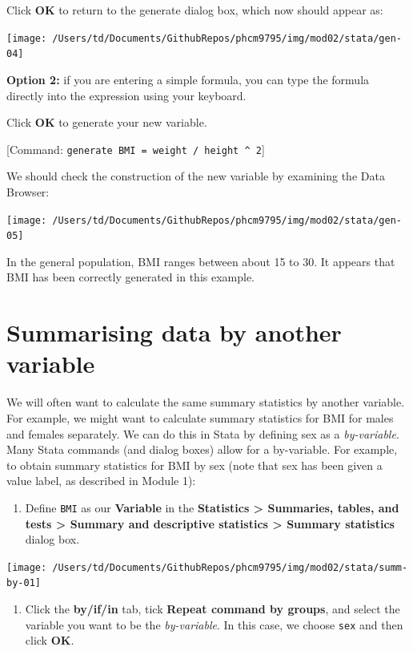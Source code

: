 \documentclass[
]{memoir}
\providecommand{\tightlist}{%
  \setlength{\itemsep}{0pt}\setlength{\parskip}{0pt}}
\begin{document}
Click \textbf{OK} to return to the generate dialog box, which now should appear as:

\texttt{[image: /Users/td/Documents/GithubRepos/phcm9795/img/mod02/stata/gen-04]}

\textbf{Option 2:} if you are entering a simple formula, you can type the formula directly into the expression using your keyboard.

Click \textbf{OK} to generate your new variable.

{[}Command: \texttt{generate\ BMI\ =\ weight\ /\ height\ \^{}\ 2}{]}

We should check the construction of the new variable by examining the Data Browser:

\texttt{[image: /Users/td/Documents/GithubRepos/phcm9795/img/mod02/stata/gen-05]}

In the general population, BMI ranges between about 15 to 30. It appears that BMI has been correctly generated in this example.

\hypertarget{summarising-data-by-another-variable}{%
\section{Summarising data by another variable}\label{summarising-data-by-another-variable}}

We will often want to calculate the same summary statistics by another variable. For example, we might want to calculate summary statistics for BMI for males and females separately. We can do this in Stata by defining sex as a \emph{by-variable}.
Many Stata commands (and dialog boxes) allow for a by-variable. For example, to obtain summary statistics for BMI by sex (note that sex has been given a value label, as described in Module 1):

\begin{enumerate}
\def\labelenumi{\arabic{enumi})}
\tightlist
\item
  Define \texttt{BMI} as our \textbf{Variable} in the \textbf{Statistics \textgreater{} Summaries, tables, and tests \textgreater{} Summary and descriptive statistics \textgreater{} Summary statistics} dialog box.
\end{enumerate}

\texttt{[image: /Users/td/Documents/GithubRepos/phcm9795/img/mod02/stata/summ-by-01]}

\begin{enumerate}
\def\labelenumi{\arabic{enumi})}
\setcounter{enumi}{1}
\tightlist
\item
  Click the \textbf{by/if/in} tab, tick \textbf{Repeat command by groups}, and select the variable you want to be the \emph{by-variable}. In this case, we choose \texttt{sex} and then click \textbf{OK}.
\end{enumerate}
\end{document}
